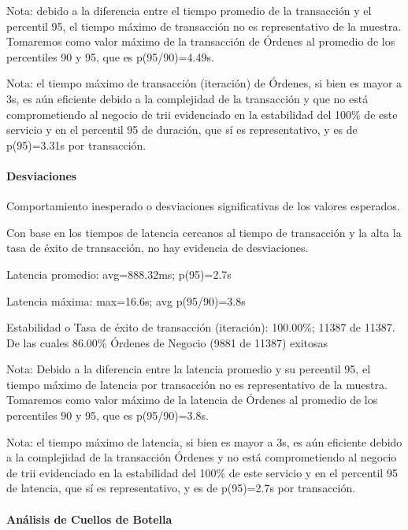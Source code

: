 \documentclass[
  paper=a4,
  ,captions=tableheading
]{scrartcl}
\renewenvironment{quote}{\begin{customblockquote}\list{}{\rightmargin=0em\leftmargin=0em}%
\item\relax\color{blockquote-text}\ignorespaces}{\unskip\unskip\endlist\end{customblockquote}}
\begin{document}
Nota: debido a la diferencia entre el tiempo promedio de la transacción
y el percentil 95, el tiempo máximo de transacción no es representativo
de la muestra. Tomaremos como valor máximo de la transacción de Órdenes
al promedio de los percentiles 90 y 95, que es p(95/90)=4.49s.

Nota: el tiempo máximo de transacción (iteración) de Órdenes, si bien es
mayor a 3s, es aún eficiente debido a la complejidad de la transacción y
que no está comprometiendo al negocio de trii evidenciado en la
estabilidad del 100\% de este servicio y en el percentil 95 de duración,
que sí es representativo, y es de p(95)=3.31s por transacción.

\paragraph{Desviaciones}\label{sec:desviaciones-2}

Comportamiento inesperado o desviaciones significativas de los valores
esperados.

Con base en los tiempos de latencia cercanos al tiempo de transacción y
la alta la tasa de éxito de transacción, no hay evidencia de
desviaciones.

\begin{quote}
Latencia promedio: avg=888.32ms; p(95)=2.7s

Latencia máxima: max=16.6s; avg p(95/90)=3.8s

Estabilidad o Tasa de éxito de transacción (iteración): 100.00\%; 11387
de 11387. De las cuales 86.00\% Órdenes de Negocio (9881 de 11387)
exitosas
\end{quote}

Nota: Debido a la diferencia entre la latencia promedio y su percentil
95, el tiempo máximo de latencia por transacción no es representativo de
la muestra. Tomaremos como valor máximo de la latencia de Órdenes al
promedio de los percentiles 90 y 95, que es p(95/90)=3.8s.

Nota: el tiempo máximo de latencia, si bien es mayor a 3s, es aún
eficiente debido a la complejidad de la transacción Órdenes y no está
comprometiendo al negocio de trii evidenciado en la estabilidad del
100\% de este servicio y en el percentil 95 de latencia, que sí es
representativo, y es de p(95)=2.7s por transacción.

\paragraph{Análisis de Cuellos de
Botella}\label{sec:anuxe1lisis-de-cuellos-de-botella-2}
\end{document}
